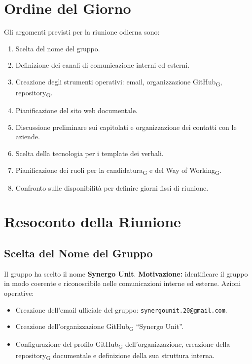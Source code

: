 \section{Ordine del Giorno}
Gli argomenti previsti per la riunione odierna sono:
\begin{enumerate}
    \item Scelta del nome del gruppo.
    \item Definizione dei canali di comunicazione interni ed esterni.
    \item Creazione degli strumenti operativi: email, organizzazione GitHub\textsubscript{G}, repository\textsubscript{G}.
    \item Pianificazione del sito web documentale.
    \item Discussione preliminare sui capitolati e organizzazione dei contatti con le aziende.
    \item Scelta della tecnologia per i template dei verbali.
    \item Pianificazione dei ruoli per la candidatura\textsubscript{G} e del Way of Working\textsubscript{G}.
    \item Confronto sulle disponibilità per definire giorni fissi di riunione.
\end{enumerate}

\section{Resoconto della Riunione}

\subsection{Scelta del Nome del Gruppo}
Il gruppo ha scelto il nome \textbf{Synergo Unit}.  
\textbf{Motivazione:} identificare il gruppo in modo coerente e riconoscibile nelle comunicazioni interne ed esterne.  
Azioni operative:
\begin{itemize}
    \item Creazione dell’email ufficiale del gruppo: \texttt{synergounit.20@gmail.com}.
    \item Creazione dell’organizzazione GitHub\textsubscript{G} “Synergo Unit”.
    \item Configurazione del profilo GitHub\textsubscript{G} dell’organizzazione, creazione della repository\textsubscript{G} documentale e definizione della sua struttura interna.
\end{itemize}

